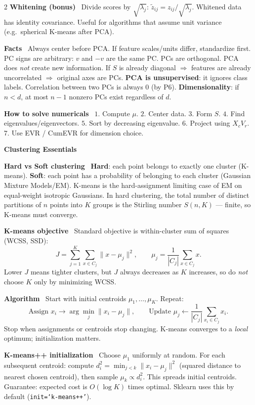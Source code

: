 \documentclass[10pt,fleqn]{article}
\newcommand{\shead}[1]{\vspace{0.1ex}\textbf{\scriptsize #1}\par}
\newcommand{\topic}[1]{\textbf{#1}\ }
\begin{document}
\begin{multicols*}{2}
\topic{Whitening (bonus)} Divide scores by \(\sqrt{\lambda_j}\): \(\tilde z_{ij}=z_{ij}/\sqrt{\lambda_j}\). Whitened data has identity covariance. Useful for algorithms that assume unit variance (e.g.\ spherical K-means after PCA).

\topic{Facts} Always center before PCA. If feature scales/units differ, standardize first. PC signs are arbitrary: \(v\) and \(-v\) are the same PC. PCs are orthogonal. PCA does \emph{not} create new information. If \(S\) is already diagonal \(\Rightarrow\) features are already uncorrelated \(\Rightarrow\) original axes are PCs. \textbf{PCA is unsupervised}: it ignores class labels. Correlation between two PCs is always 0 (by P6). \textbf{Dimensionality}: if \(n < d\), at most \(n-1\) nonzero PCs exist regardless of \(d\).

\topic{How to solve numericals} \(1.\) Compute \(\mu\). \(2.\) Center data. \(3.\) Form \(S\). \(4.\) Find eigenvalues/eigenvectors. \(5.\) Sort by decreasing eigenvalue. \(6.\) Project using \(X_cV_r\). \(7.\) Use EVR / CumEVR for dimension choice.

\shead{Clustering Essentials}
\topic{Hard vs Soft clustering} \textbf{Hard}: each point belongs to exactly one cluster (K-means). \textbf{Soft}: each point has a probability of belonging to each cluster (Gaussian Mixture Models/EM). K-means is the hard-assignment limiting case of EM on equal-weight isotropic Gaussians. In hard clustering, the total number of distinct partitions of \(n\) points into \(K\) groups is the Stirling number \(S(n,K)\) — finite, so K-means must converge.

\topic{K-means objective} Standard objective is within-cluster sum of squares (WCSS, SSD):
\[
J=\sum_{j=1}^{K}\sum_{x\in C_j}\|x-\mu_j\|^2,\qquad
\mu_j=\frac1{|C_j|}\sum_{x\in C_j}x.
\]
Lower \(J\) means tighter clusters, but \(J\) always decreases as \(K\) increases, so do \emph{not} choose \(K\) only by minimizing WCSS.

\topic{Algorithm} Start with initial centroids \(\mu_1,\dots,\mu_K\). Repeat:
\[
\text{Assign }x_i\to \arg\min_j \|x_i-\mu_j\|,\qquad
\text{Update }\mu_j\gets \frac1{|C_j|}\sum_{x_i\in C_j}x_i.
\]
Stop when assignments or centroids stop changing. K-means converges to a \emph{local} optimum; initialization matters.

\topic{K-means++ initialization} Choose \(\mu_1\) uniformly at random. For each subsequent centroid: compute \(d_i^2=\min_{j<k}\|x_i-\mu_j\|^2\) (squared distance to nearest chosen centroid), then sample \(\mu_k\propto d_i^2\). This spreads initial centroids. Guarantee: expected cost is \(O(\log K)\) times optimal. Sklearn uses this by default (\texttt{init=`k-means++'}).


\end{multicols*}
\end{document}
